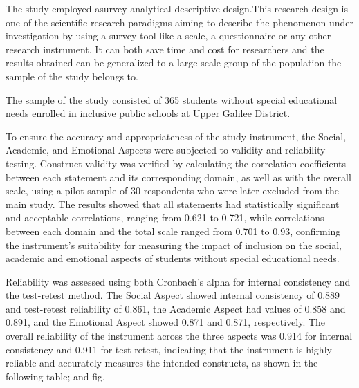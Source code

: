 \documentclass[10pt]{NSP1}
\begin{document}
\par\medskip{}\smallskip

The study employed asurvey analytical descriptive design.This research design is one of the scientific research paradigms aiming to describe the phenomenon under investigation by using a survey tool like a scale, a questionnaire or any other research instrument. It can both save time and cost for researchers and the results obtained can be generalized to a large scale group of the population the sample of the study belongs to.

\par\medskip{}\smallskip

The sample of the study consisted of 365 students without special educational needs enrolled in inclusive public schools at Upper Galilee District.

\par\medskip{}\smallskip

To ensure the accuracy and appropriateness of the study instrument, the Social, Academic, and Emotional Aspects were subjected to validity and reliability testing. Construct validity was verified by calculating the correlation coefficients between each statement and its corresponding domain, as well as with the overall scale, using a pilot sample of 30 respondents who were later excluded from the main study. The results showed that all statements had statistically significant and acceptable correlations, ranging from 0.621 to 0.721, while correlations between each domain and the total scale ranged from 0.701 to 0.93, confirming the instrument's suitability for measuring the impact of inclusion on the social, academic and emotional aspects of students without special educational needs.

Reliability was assessed using both Cronbach's alpha for internal consistency and the test-retest method. The Social Aspect showed internal consistency of 0.889 and test-retest reliability of 0.861, the Academic Aspect had values of 0.858 and 0.891, and the Emotional Aspect showed 0.871 and 0.871, respectively. The overall reliability of the instrument across the three aspects was 0.914 for internal consistency and 0.911 for test-retest, indicating that the instrument is highly reliable and accurately measures the intended constructs, as shown in the following table; and fig.
\end{document}
